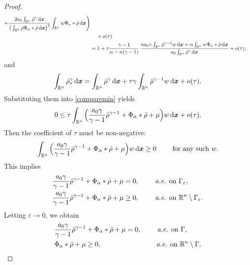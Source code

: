 \documentclass[reqno,11pt]{amsart}
\numberwithin{equation}{section}
\theoremstyle{definition}
\def\dd{{\, \rm d}}
\begin{document}
\begin{proof}
\begin{align*}
\begin{split}
 + \frac{2a_0 \int_{\mathbb{R}^n} \bar{\rho}^\gamma \dd \boldsymbol{x}}{\big (\int_{\mathbb{R}^n} \bar{\rho} \Phi_\alpha * \bar{\rho} \dd \boldsymbol{x} \big )^2} \int_{\mathbb{R}^n} w \Phi_\alpha * \bar{\rho} \dd \boldsymbol{x}  \Bigg ) \\
 &\quad\, + o(\tau) \\
 & = 1 + \tau \frac{\gamma - 1}{\alpha - n(\gamma - 1)}\,
 \frac{n a_0 \gamma \int_{\mathbb{R}^n} \bar{\rho}^{\gamma - 1} w \dd \boldsymbol{x} + \alpha \int_{\mathbb{R}^n} w \Phi_\alpha * \bar{\rho} \dd \boldsymbol{x}}{a_0 \int_{\mathbb{R}^n} \bar{\rho}^\gamma \dd \boldsymbol{x}} + o(\tau),
\end{split}
    \end{align*}
and
    \begin{equation*}
  \int_{\mathbb{R}^n} \bar{\rho}_\tau^\gamma \dd \boldsymbol{x} = \int_{\mathbb{R}^n} \bar{\rho}^\gamma \dd \boldsymbol{x} + \tau \gamma \int_{\mathbb{R}^n} \bar{\rho}^{\gamma - 1} w \dd \boldsymbol{x} + o(\tau).
    \end{equation*}
Substituting them into \eqref{comparemin} yields
    \[
 0 \leq \tau \int_{\mathbb{R}^n} \Big ( \frac{a_0\gamma}{\gamma - 1} \bar{\rho}^{\gamma - 1} + \Phi_\alpha * \bar{\rho} + \mu \Big) w \dd \boldsymbol{x} + o(\tau).
    \]
Then the coefficient of $\tau$ must be non-negative:
    \[
 \int_{\mathbb{R}^n} \Big ( \frac{a_0\gamma}{\gamma - 1} \bar{\rho}^{\gamma - 1} + \Phi_\alpha * \bar{\rho} + \mu \Big) w \dd \boldsymbol{x} \geq 0
 \qquad\mbox{ for any such $w$}.
    \]
This implies
\[
    \begin{split}
        & \frac{a_0\gamma}{\gamma - 1} \bar{\rho}^{\gamma - 1} + \Phi_\alpha * \bar{\rho} + \mu = 0, \qquad  \text{ {\it a.e.} on } \Gamma_\varepsilon,\\
        & \frac{a_0\gamma}{\gamma - 1} \bar{\rho}^{\gamma - 1} + \Phi_\alpha * \bar{\rho} + \mu \geq 0, \quad \,\,\,\,\,\, \text{ {\it a.e.} on } \mathbb{R}^n \setminus \Gamma_\varepsilon.
    \end{split}
\]
Letting $\varepsilon \to 0$, we obtain 
\begin{equation}\label{EulerLagrange}
    \begin{split}
        & \frac{a_0\gamma}{\gamma - 1} \bar{\rho}^{\gamma - 1} + \Phi_\alpha * \bar{\rho} + \mu = 0, \qquad  \text{ {\it a.e.} on } \Gamma,\\
        & \Phi_\alpha * \bar{\rho} + \mu \geq 0, \qquad \qquad \qquad \quad \,\,\,\, \text{ {\it a.e.} on } \mathbb{R}^n \setminus \Gamma.
    \end{split}

\end{equation}
\end{proof}
\end{document}
